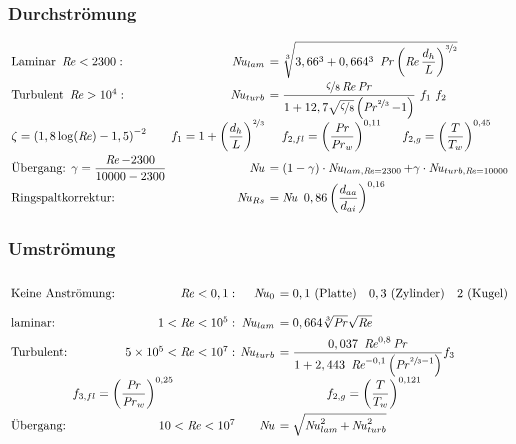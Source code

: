 \subsubsection{Durchströmung}
	\setlength{\abovedisplayskip}{-20pt}
	\[ \arraycolsep=0.2em  \def\arraystretch{2}
	\begin{array}{lrll}
		\text{Laminar } \Reyn <2300: & \Nuss_{lam} & \multicolumn{2}{l}{ = \sqrt[3]{3,66^3 + 0,664^3\ \Pran \left(\Reyn \dfrac{d_h}{L}\right)^{\nicefrac{3}{2}}}}\\
		\text{Turbulent } \Reyn>10^4: &\Nuss_{turb} & \multicolumn{2}{l}{ = \dfrac{\nicefrac{ \zeta}{8}\Reyn\Pran}{1 + 12,7 \sqrt{\nicefrac{ \zeta}{8}} \left( \Pran^{\nicefrac{2}{3}} - 1\right)} \ f_1 \ f_2 } \\
		 \zeta = \left(1,8 \log(\Reyn) - 1,5\right)^{-2} & f_1 = 1 + \left(\dfrac{d_h}{L}\right)^{\nicefrac{2}{3}} & \quad f_{2,fl} = \left(\dfrac{\Pran}{\Pran_w}\right)^{0,11} &\quad f_{2,g} = \left(\dfrac{T}{T_w}\right)^{0,45} \\
		\text{Übergang: } \gamma = \dfrac{\Reyn-2300}{10000-2300} &\Nuss & \multicolumn{2}{l}{= (1-\gamma)\cdot \Nuss_{lam,\Reyn=2300} + \gamma\cdot \Nuss_{turb,\Reyn=10000}}\\
		\text{Ringspaltkorrektur: }&\Nuss_{Rs}& = \Nuss\ 0,86 \left(\dfrac{d_{aa}}{d_{ai}}\right)^{0,16}&
	\end{array} \]

\subsubsection{Umströmung}
	\setlength{\abovedisplayskip}{-20pt}
	\[ \arraycolsep=0.2em  \def\arraystretch{2}
	\begin{array}{lrrl}
		\text{Keine Anströmung: } & \Reyn<0,1:            & \Nuss_0      & = 0,1\ (\text{Platte}) \quad 0,3\ (\text{Zylinder}) \quad 2\ (\text{Kugel})                        \\
		\text{laminar: }          & 1<\Reyn<10^5:         & \Nuss_{lam}  & = 0,664 \sqrt[3]{\Pran}\sqrt{\Reyn}                                                                \\
		\text{Turbulent: }        & \num{5e5}<\Reyn<10^7: & \Nuss_{turb} & = \dfrac{0,037\ \Reyn^{0,8} \Pran}{1+ 2,443\ \Reyn^{-0,1} \left(\Pran^{\sfrac{2}{3}-1}\right)} f_3\\
		\multicolumn{2}{c}{f_{3,fl} =\left(\dfrac{\Pran}{\Pran_w}\right)^{0,25}} & \multicolumn{2}{c}{f_{2,g} = \left(\dfrac{T}{T_w}\right)^{0,121}}\\
		\text{Übergang: } & 10<\Reyn<10^7 & \Nuss& = \sqrt{\Nuss_{lam}^2 + \Nuss_{turb}^2}
	\end{array} \]

